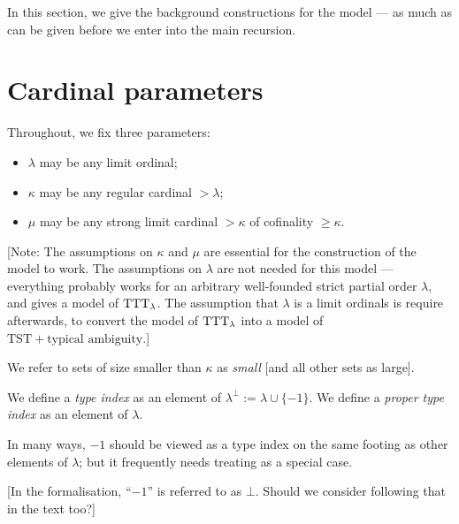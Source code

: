In this section, we give the background constructions for the model — as much as can be given before we enter into the main recursion.

\section{Cardinal parameters}

\begin{definition}
\label {def:params}
\leanok
{}
Throughout, we fix three parameters:
\begin{itemize}
  \item $\lambda$ may be any limit ordinal;
  \item $\kappa$ may be any regular cardinal $>\lambda$;
  \item $\mu$ may be any strong limit cardinal $>\kappa$ of cofinality $\geq \kappa$.
\end{itemize}

[Note: The assumptions on $\kappa$ and $\mu$ are essential for the construction of the model to work.  The assumptions on $\lambda$ are not needed for this model — everything probably works for an arbitrary well-founded strict partial order $\lambda$, and gives a model of $\mathrm{TTT}_\lambda$. The assumption that $\lambda$ is a limit ordinals is require afterwards, to convert the model of $\mathrm{TTT}_\lambda$ into a model of $\mathrm{TST} + \text{typical ambiguity}$.]
\end{definition}

\begin{definition}
  \label {def:small}
  \leanok
  We refer to sets of size smaller than $\kappa$ as \emph{small} [and all other sets as large].
  \end{definition}

\begin{definition}
\label {def:type-index}
\leanok
{}
We define a {\em type index} as an element of $\lambda^\bot := \lambda \cup \{-1\}$.
We define a {\em proper type index} as an element of $\lambda$.

In many ways, $-1$ should be viewed as a type index on the same footing as other elements of $\lambda$; but it frequently needs treating as a special case.

[In the formalisation, “$-1$” is referred to as $\bot$.  Should we consider following that in the text too?]
\end{definition}


